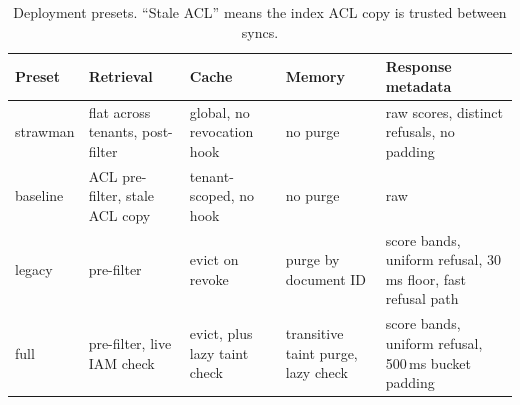 \begin{table}[tbp]
\centering
\caption{Deployment presets. ``Stale ACL'' means the index ACL copy is trusted between syncs.}
\label{tab:presets}
\small
\begin{tabular}{@{}p{1.6cm}p{3.1cm}p{2.8cm}p{2.8cm}p{3.3cm}@{}}
\toprule
Preset & Retrieval & Cache & Memory & Response metadata \\
\midrule
strawman & flat across tenants, post-filter & global, no revocation hook & no purge & raw scores, distinct refusals, no padding \\
baseline & ACL pre-filter, stale ACL copy & tenant-scoped, no hook & no purge & raw \\
legacy & pre-filter & evict on revoke & purge by document ID & score bands, uniform refusal, 30\,ms floor, fast refusal path \\
full & pre-filter, live IAM check & evict, plus lazy taint check & transitive taint purge, lazy check & score bands, uniform refusal, 500\,ms bucket padding \\
\bottomrule
\end{tabular}
\end{table}
